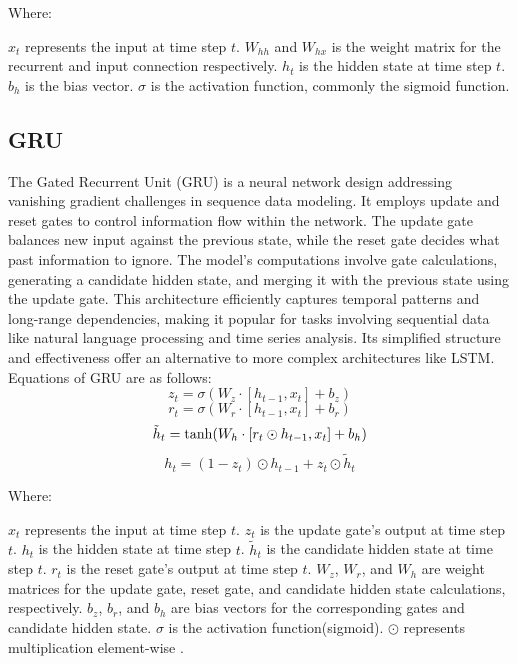 \documentclass[sn-mathphys,Numbered]{sn-jnl}
\theoremstyle{thmstyleone}
\theoremstyle{thmstyletwo}
\theoremstyle{thmstylethree}
\begin{document}
Where:

\(x_t\) represents the input at time step \(t\).
 \(W_{hh}\) and \(W_{hx}\) is the weight matrix for the recurrent and input connection respectively.
 \(h_t\) is the hidden state at time step \(t\).
 \(b_h\) is the bias vector.
 \(\sigma\) is the activation function, commonly the sigmoid function.

\subsection{GRU}

The Gated Recurrent Unit (GRU) is a neural network design addressing vanishing gradient challenges in sequence data modeling. It employs update and reset gates to control information flow within the network. The update gate balances new input against the previous state, while the reset gate decides what past information to ignore. The model's computations involve gate calculations, generating a candidate hidden state, and merging it with the previous state using the update gate. This architecture efficiently captures temporal patterns and long-range dependencies, making it popular for tasks involving sequential data like natural language processing and time series analysis. Its simplified structure and effectiveness offer an alternative to more complex architectures like LSTM. Equations of GRU are as follows:
\begin{equation}
z_t = \sigma(W_z \cdot [h_{t-1}, x_t]  +  b_z) 
\end{equation}
\begin{equation}
r_t = \sigma(W_r \cdot [h_{t-1}, x_t] +   b_r) 
\end{equation}
\begin{equation}
\tilde{h}_t = \tanh(W_h \cdot [r_t \odot h_{t-1}, x_t]  +  b_h) \\
\end{equation}
\begin{equation}
h_t = (1 - z_t) \odot h_{t-1} + z_t \odot \tilde{h}_t
\end{equation}



Where:

 \(x_t\) represents the input at time step \(t\).
 \(z_t\) is the update gate's output at time step \(t\).
 \(h_t\) is the hidden state at time step \(t\).
 \(\tilde{h}_t\) is the candidate hidden state at time step \(t\).
 \(r_t\) is the reset gate's output at time step \(t\).
 \(W_z\), \(W_r\), and \(W_h\) are weight matrices for the update gate, reset gate, and candidate hidden state calculations, respectively.
 \(b_z\), \(b_r\), and \(b_h\) are bias vectors for the corresponding gates and candidate hidden state.
 \(\sigma\) is the activation function(sigmoid).
 \(\odot\) represents multiplication element-wise .
\end{document}
